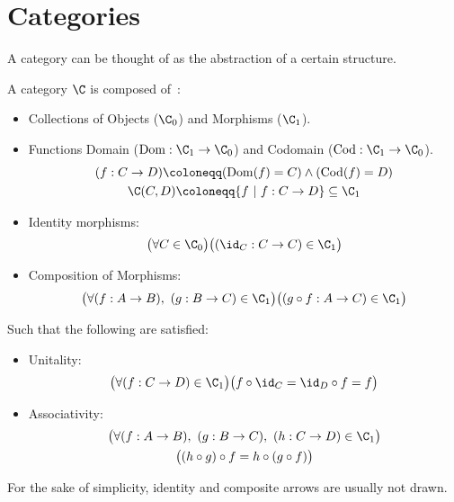 \section{Categories}
A category can be thought of as the abstraction of a certain structure.

\begin{definition}[Category]

  A category $\C$ is composed of~\parencite[p.~4]{awodey:category_theory}:
  \begin{itemize}
    \item Collections of Objects ($\C_0$) and Morphisms ($\C_1$).
    \item Functions Domain ($\mathrm{Dom}:\C_1\to \C_0$) and Codomain
      ($\mathrm{Cod}: \C_1 \to \C_0$).
      \[
        \begin{gathered}
          (f : C\to D)
          \coloneqq (\mathrm{Dom}(f) = C) \land (\mathrm{Cod}(f) = D)\\
          \C(C, D) \coloneqq \{f\ |\ f : C \to D\}\subseteq \C_1
        \end{gathered}
      \]
    \item Identity morphisms:
      \[\big(\forall C \in \C_0\big)
        \big((\id_C : C\to C)\in \C_1\big)\]
    \item Composition of Morphisms:
      \[\big(\forall (f:A \to B),\ (g : B\to C) \in \C_1\big)
        \big((g\circ f:A\to C) \in \C_1\big)\]
  \end{itemize}

  Such that the following are satisfied:
  \begin{itemize}
    \item Unitality:
      \[\big(\forall (f:C\to D)\in \C_1\big)
        \big(f \circ \id_C = \id_D \circ f = f\big)\]
    \item Associativity:
      \[
        \begin{gathered}
          \big(\forall (f : A\to B),\ (g: B\to C),\ (h: C\to D)\in\C_1\big)\\
          \big((h \circ g) \circ f = h \circ (g \circ f)\big)
        \end{gathered}
      \]
  \end{itemize}
\end{definition}

\begin{remark}
  For the sake of simplicity, identity and composite arrows are usually not
  drawn.
\end{remark}

